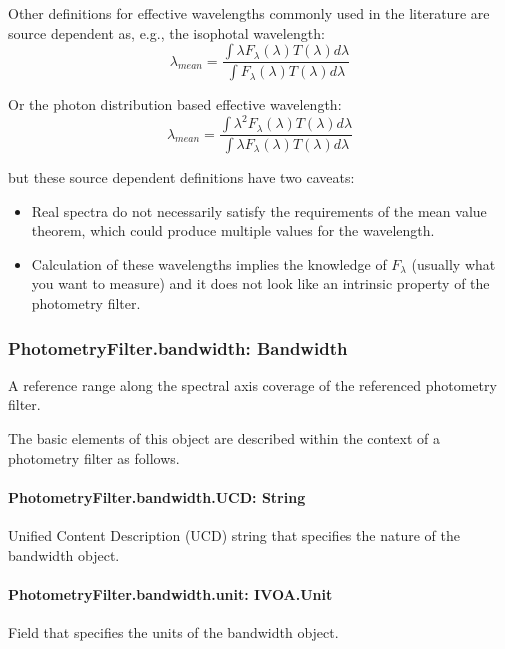 \documentclass[11pt,a4paper]{ivoa}
\begin{document}
Other definitions for effective wavelengths commonly used in the literature
are source dependent as, e.g., the isophotal wavelength:
\begin{equation} \label{eq:19}
\lambda_{mean} = \frac{\int \lambda F_\lambda(\lambda)T(\lambda)d\lambda}{\int F_\lambda(\lambda)T(\lambda)d\lambda}
\end{equation}

Or the photon distribution based effective wavelength:
\begin{equation} \label{eq:20}
\lambda_{mean} = \frac{\int \lambda^2 F_\lambda(\lambda)T(\lambda)d\lambda}{\int \lambda F_\lambda(\lambda)T(\lambda)d\lambda}
\end{equation}

but these source dependent definitions have two caveats:

\begin{itemize}
	\item{Real spectra do not necessarily satisfy the requirements of the mean value theorem,
	which could produce multiple values for the wavelength.}

	\item{Calculation of these wavelengths implies the knowledge of $F_\lambda $ (usually
	what you want to measure) and it does not look like an intrinsic property of the
	photometry filter.}
\end{itemize}\par

\subsubsection{PhotometryFilter.bandwidth: Bandwidth}
A reference range along the spectral axis coverage of the referenced photometry filter.
\par

The basic elements of this object are described
within the context of a photometry filter as follows.
\par

\paragraph{PhotometryFilter.bandwidth.UCD: String}
Unified Content Description (UCD) string that specifies the nature of the bandwidth object.
\par

\paragraph{PhotometryFilter.bandwidth.unit: IVOA.Unit}
Field that specifies the units of the bandwidth object.
\par
\end{document}
